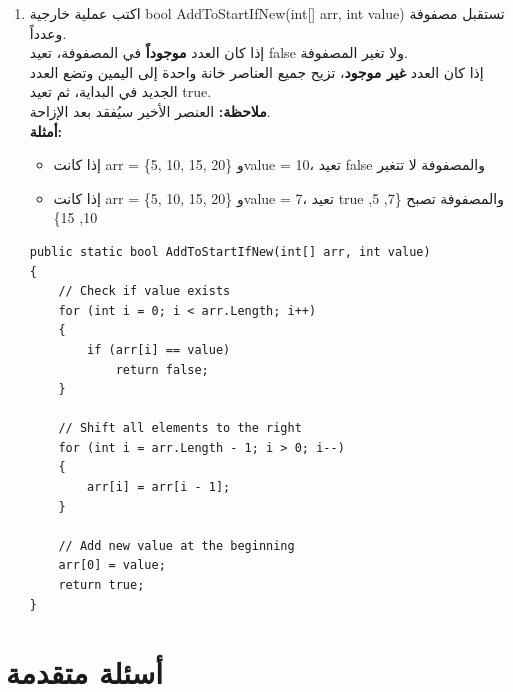 \documentclass[14pt]{extarticle}
\begin{document}
\begin{enumerate}[resume, itemsep=2em]
    \item
    اكتب عملية خارجية \textenglish{bool AddToStartIfNew(int[] arr, int value)} تستقبل مصفوفة وعدداً.\\
    إذا كان العدد \textbf{موجوداً} في المصفوفة، تعيد \textenglish{false} ولا تغير المصفوفة.\\
    إذا كان العدد \textbf{غير موجود}، تزيح جميع العناصر خانة واحدة إلى اليمين وتضع العدد الجديد في البداية، ثم تعيد \textenglish{true}.\\
    \textbf{ملاحظة:} العنصر الأخير سيُفقد بعد الإزاحة.\\
    \textbf{أمثلة:}
    \begin{itemize}
        \item إذا كانت \textenglish{arr = \{5, 10, 15, 20\}} و\textenglish{value = 10}، تعيد \textenglish{false} والمصفوفة لا تتغير
        \item إذا كانت \textenglish{arr = \{5, 10, 15, 20\}} و\textenglish{value = 7}، تعيد \textenglish{true} والمصفوفة تصبح \textenglish{\{7, 5, 10, 15\}}
    \end{itemize}
    \ifwithsols
    \begin{boxSolution}
    \begin{english}
    \begin{verbatim}
public static bool AddToStartIfNew(int[] arr, int value)
{
    // Check if value exists
    for (int i = 0; i < arr.Length; i++)
    {
        if (arr[i] == value)
            return false;
    }

    // Shift all elements to the right
    for (int i = arr.Length - 1; i > 0; i--)
    {
        arr[i] = arr[i - 1];
    }

    // Add new value at the beginning
    arr[0] = value;
    return true;
}
    \end{verbatim}
    \end{english}
    \end{boxSolution}
    \fi

\end{enumerate}

\clearpage

\section{أسئلة متقدمة}
\end{document}
